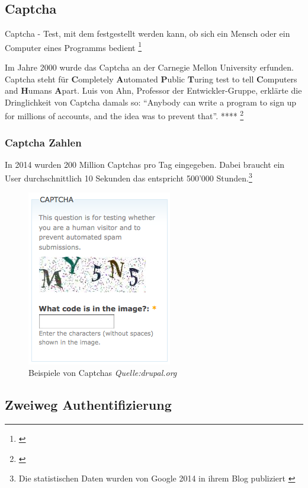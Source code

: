 \subsection{Captcha}\label{captcha}

Captcha - Test, mit dem festgestellt werden kann, ob sich ein Mensch
oder ein Computer eines Programms bedient \footnote{\autocite{duden}}

Im Jahre 2000 wurde das Captcha an der Carnegie Mellon University
erfunden. Captcha steht für \textbf{C}ompletely \textbf{A}utomated
\textbf{P}ublic \textbf{T}uring test to tell \textbf{C}omputers and
\textbf{H}umans \textbf{A}part. Luis von Ahn, Professor der
Entwickler-Gruppe, erklärte die Dringlichkeit von Captcha damals so:
``Anybody can write a program to sign up for millions of accounts, and
the idea was to prevent that''. **** \footnote{\autocite{captcha}}

\subsubsection{Captcha Zahlen}\label{captcha-zahlen}

In 2014 wurden 200 Million Captchas pro Tag eingegeben. Dabei braucht
ein User durchschnittlich 10 Sekunden das entspricht 500'000
Stunden.\footnote{Die statistischen Daten wurden von Google 2014 in
  ihrem Blog publiziert \autocite{googlecaptcha}}

\begin{figure}[htbp]
\centering
\includegraphics{images/captcha.png}
\caption{Beispiele von Captchas \emph{Quelle:drupal.org}}
\end{figure}

\subsection{Zweiweg Authentifizierung}\label{zweiweg-authentifizierung}

